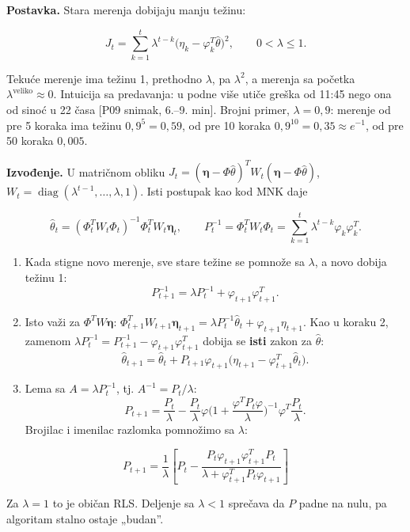 \documentclass[11pt,a4paper,parskip=half,headsepline,numbers=noenddot]{scrartcl}
\DeclareRobustCommand{\izvor}[1]{{\small\color{izvorC}[#1]}}
\begin{document}
\textbf{Postavka.} Stara merenja dobijaju manju težinu:

\[J_t = \sum_{k=1}^t\lambda^{t-k}\big(\eta_k - \varphi_k^T\hat\theta\big)^2,\qquad 0 < \lambda \le 1 .\]

Tekuće merenje ima težinu 1, prethodno \(\lambda\), pa \(\lambda^2\), a merenja sa početka \(\lambda^{\text{veliko}} \approx 0\). Intuicija sa predavanja: u podne više utiče greška od 11:45 nego ona od sinoć u 22 časa \izvor{P09 snimak, 6.--9. min}. Brojni primer, \(\lambda = 0{,}9\): merenje od pre 5 koraka ima težinu \(0{,}9^5 = 0{,}59\), od pre 10 koraka \(0{,}9^{10} = 0{,}35 \approx e^{-1}\), od pre 50 koraka \(0{,}005\).

\textbf{Izvođenje.} U matričnom obliku \(J_t = (\boldsymbol\eta - \Phi\hat\theta)^TW_t(\boldsymbol\eta - \Phi\hat\theta)\), \(W_t = \operatorname{diag}(\lambda^{t-1}, \dots, \lambda, 1)\). Isti postupak kao kod MNK daje

\[\hat\theta_t = (\Phi_t^TW_t\Phi_t)^{-1}\Phi_t^TW_t\boldsymbol\eta_t,\qquad P_t^{-1} = \Phi_t^TW_t\Phi_t = \sum_{k=1}^t\lambda^{t-k}\varphi_k\varphi_k^T .\]

\begin{enumerate}
\def\labelenumi{\arabic{enumi}.}
\item Kada stigne novo merenje, sve stare težine se pomnože sa \(\lambda\), a novo dobija težinu 1:
  \[P_{t+1}^{-1} = \lambda P_t^{-1} + \varphi_{t+1}\varphi_{t+1}^T .\]
\item Isto važi za \(\Phi^TW\boldsymbol\eta\): \(\Phi_{t+1}^TW_{t+1}\boldsymbol\eta_{t+1} = \lambda P_t^{-1}\hat\theta_t + \varphi_{t+1}\eta_{t+1}\). Kao u koraku 2, zamenom \(\lambda P_t^{-1} = P_{t+1}^{-1} - \varphi_{t+1}\varphi_{t+1}^T\) dobija se \textbf{isti} zakon za \(\hat\theta\):
  \[\hat\theta_{t+1} = \hat\theta_t + P_{t+1}\varphi_{t+1}\big(\eta_{t+1} - \varphi_{t+1}^T\hat\theta_t\big).\]
\item Lema sa \(A = \lambda P_t^{-1}\), tj. \(A^{-1} = P_t/\lambda\):
  \[P_{t+1} = \frac{P_t}{\lambda} - \frac{P_t}{\lambda}\varphi\Big(1 + \frac{\varphi^TP_t\varphi}{\lambda}\Big)^{-1}\varphi^T\frac{P_t}{\lambda}.\]
  Brojilac i imenilac razlomka pomnožimo sa \(\lambda\):
\end{enumerate}

\[P_{t+1} = \frac{1}{\lambda}\left[P_t - \frac{P_t\varphi_{t+1}\varphi_{t+1}^TP_t}{\lambda + \varphi_{t+1}^TP_t\varphi_{t+1}}\right]\]

Za \(\lambda = 1\) to je običan RLS. Deljenje sa \(\lambda < 1\) sprečava da \(P\) padne na nulu, pa algoritam stalno ostaje „budan''.
\end{document}
